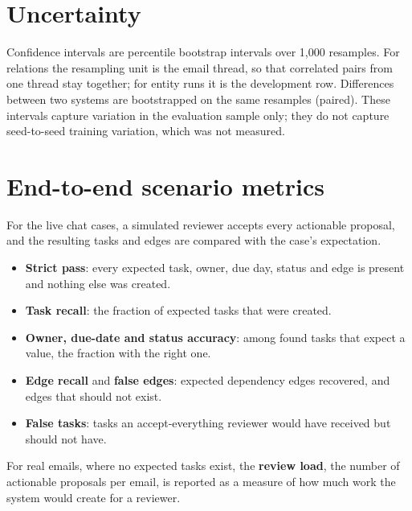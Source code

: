 \section{Uncertainty}
Confidence intervals are percentile bootstrap intervals \citep{efron1993bootstrap} over 1,000 resamples. For relations the resampling unit is the email thread, so that correlated pairs from one thread stay together; for entity runs it is the development row. Differences between two systems are bootstrapped on the same resamples (paired). These intervals capture variation in the evaluation sample only; they do not capture seed-to-seed training variation, which was not measured.

\section{End-to-end scenario metrics}
For the live chat cases, a simulated reviewer accepts every actionable proposal, and the resulting tasks and edges are compared with the case's expectation.
\begin{itemize}
  \item \textbf{Strict pass}: every expected task, owner, due day, status and edge is present and nothing else was created.
  \item \textbf{Task recall}: the fraction of expected tasks that were created.
  \item \textbf{Owner, due-date and status accuracy}: among found tasks that expect a value, the fraction with the right one.
  \item \textbf{Edge recall} and \textbf{false edges}: expected dependency edges recovered, and edges that should not exist.
  \item \textbf{False tasks}: tasks an accept-everything reviewer would have received but should not have.
\end{itemize}
For real emails, where no expected tasks exist, the \textbf{review load}, the number of actionable proposals per email, is reported as a measure of how much work the system would create for a reviewer.

